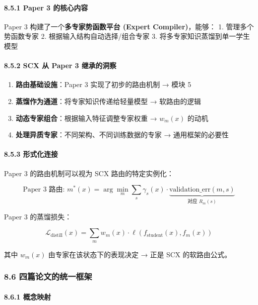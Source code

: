 \documentclass[
  12pt,
]{ctexart}
\providecommand{\tightlist}{%
  \setlength{\itemsep}{0pt}\setlength{\parskip}{0pt}}
\begin{document}
\paragraph{8.5.1 Paper 3
的核心内容}\label{paper-3-ux7684ux6838ux5fc3ux5185ux5bb9}

Paper 3 构建了一个\textbf{多专家势函数平台 (Expert Compiler)}，能够： 1.
管理多个势函数专家 2. 根据输入结构自动选择/组合专家 3.
将多专家知识蒸馏到单一学生模型

\paragraph{8.5.2 SCX 从 Paper 3
继承的洞察}\label{scx-ux4ece-paper-3-ux7ee7ux627fux7684ux6d1eux5bdf}

\begin{enumerate}
\def\labelenumi{\arabic{enumi}.}
\tightlist
\item
  \textbf{路由基础设施}：Paper 3 实现了初步的路由机制 → 模块 5
\item
  \textbf{蒸馏作为通道}：将专家知识传递给轻量模型 → 软路由的逻辑
\item
  \textbf{动态专家组合}：根据输入特征调整专家权重 → \(w_m(x)\) 的动机
\item
  \textbf{处理异质专家}：不同架构、不同训练数据的专家 → 通用框架的必要性
\end{enumerate}

\paragraph{8.5.3 形式化连接}\label{ux5f62ux5f0fux5316ux8fdeux63a5-2}

Paper 3 的路由机制可以视为 SCX 路由的特定实例化：

\[
\text{Paper 3 路由: } m^*(x) = \arg\min_m \sum_s \gamma_s(x) \cdot \underbrace{\text{validation\_err}(m,s)}_{\text{对应 } R_m(s)}
\]

Paper 3 的蒸馏损失：

\[
\mathcal{L}_{\text{distill}}(x) = \sum_m w_m(x) \cdot \ell(f_{\text{student}}(x), f_m(x))
\]

其中 \(w_m(x)\) 由专家在该状态下的表现决定 → 正是 SCX 的软路由公式。

\subsubsection{8.6
四篇论文的统一框架}\label{ux56dbux7bc7ux8bbaux6587ux7684ux7edfux4e00ux6846ux67b6}

\paragraph{8.6.1 概念映射}\label{ux6982ux5ff5ux6620ux5c04}
\end{document}
